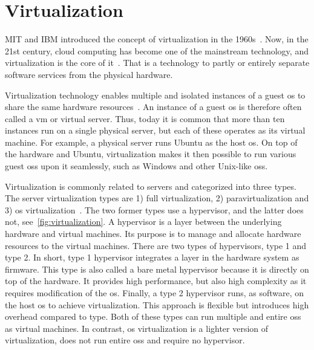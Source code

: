 %
%
\section{Virtualization}

MIT and IBM introduced the concept of virtualization in the 1960s~\cite{daniels2009server}.
Now, in the 21st century, cloud computing has become one of the mainstream technology, and virtualization is the core of it~\cite{srinivasan2014cloud}.
That is a technology to partly or entirely separate software services from the physical hardware.

\skippara Virtualization technology enables multiple and isolated instances of a guest \gls{os} to share the same hardware resources~\cite{cherkaoui2014virtualization}.
An instance of a guest \gls{os} is therefore often called a \gls{vm} or virtual server.
Thus, today it is common that more than ten instances run on a single physical server, but each of these operates as its virtual machine.
For example, a physical server runs Ubuntu as the host \gls{os}.
On top of the hardware and Ubuntu, virtualization makes it then possible to run various guest \gls{os}s upon it seamlessly, such as Windows and other Unix-like \gls{os}s.


\skippara Virtualization is commonly related to servers and categorized into three types.
The server virtualization types are 1) full virtualization, 2) paravirtualization and 3) \gls{os} virtualization~\cite{bauer2012reliability}.
The two former types use a hypervisor, and the latter does not, see~\cref{fig:virtualization}.
A hypervisor is a layer between the underlying hardware and virtual machines.
Its purpose is to manage and allocate hardware resources to the virtual machines.
There are two types of hypervisors, type 1 and type 2.
\skippara In short, type 1 hypervisor integrates a layer in the hardware system as firmware.
This type is also called a bare metal hypervisor because it is directly on top of the hardware.
It provides high performance, but also high complexity as it requires modification of the \gls{os}.
Finally, a type 2 hypervisor runs, as software, on the host \gls{os} to achieve virtualization.
This approach is flexible but introduces high overhead compared to type.
Both of these types can run multiple and entire \gls{os}s as virtual machines.
In contrast, \gls{os} virtualization is a lighter version of virtualization, does not run entire \gls{os}s and require no hypervisor.

